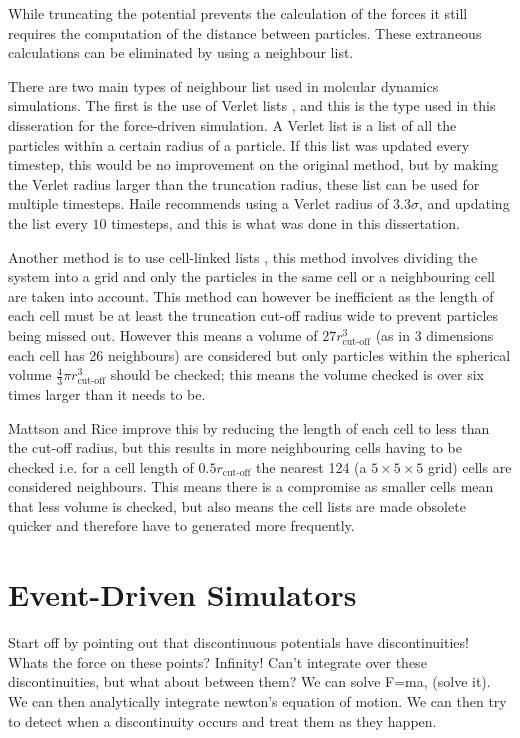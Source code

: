 \message{ !name(main.tex)}\documentclass[12pt]{UoAthesis}
\begin{document}
While truncating the potential prevents the calculation of the forces
it still requires the computation of the distance between particles.
These extraneous calculations can be eliminated by using a neighbour list.

There are two main types of neighbour list used in molcular dynamics
simulations.  The first is the use of Verlet lists \cite{Verlet1967},
and this is the type used in this disseration for the force-driven
simulation.  A Verlet list is a list of all the particles within a
certain radius of a particle.  If this list was updated every
timestep, this would be no improvement on the original method, but by
making the Verlet radius larger than the truncation radius, these list
can be used for multiple timesteps.  Haile \cite{Haile1997} recommends
using a Verlet radius of $3.3\sigma$, and updating the list every $10$
timesteps, and this is what was done in this dissertation.

Another method is to use cell-linked lists \cite{Poschel2005}, this
method involves dividing the system into a grid and only the particles
in the same cell or a neighbouring cell are taken into account.  This
method can however be inefficient as the length of each cell must be
at least the truncation cut-off radius wide to prevent particles being
missed out.  However this means a volume of $27r_{\text{cut-off}}^3$
(as in 3 dimensions each cell has 26 neighbours) are considered but
only particles within the spherical volume $\frac{4}{3}\pi
r_{\text{cut-off}}^3$ should be checked; this means the volume checked
is over six times larger than it needs to be.  

Mattson and Rice \cite{Mattson1999} improve this by reducing the
length of each cell to less than the cut-off radius, but this results
in more neighbouring cells having to be checked i.e. for a cell length
of $0.5r_{\text{cut-off}}$ the nearest 124 (a $5\times 5\times 5$
grid) cells are considered neighbours. This means there is a
compromise as smaller cells mean that less volume is checked, but also
means the cell lists are made obsolete quicker and therefore have to
generated more frequently.

 \newpage
\section{Event-Driven Simulators}
 
Start off by pointing out that discontinuous potentials have
discontinuities! Whats the force on these points? Infinity! Can't
integrate over these discontinuities, but what about between them? We
can solve F=ma, (solve it). We can then analytically integrate
newton's equation of motion. We can then try to detect when a
discontinuity occurs and treat them as they happen.
\end{document}
